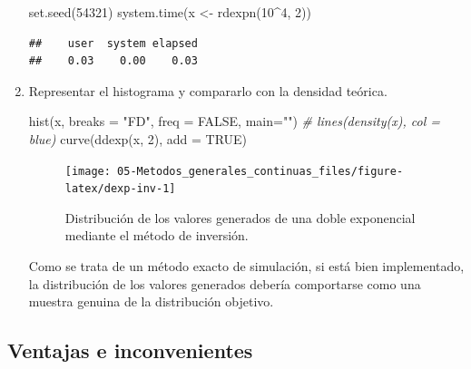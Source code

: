 \documentclass[
]{book}
\newenvironment{Shaded}{\begin{snugshade}}{\end{snugshade}}
\newcommand{\AttributeTok}[1]{\textcolor[rgb]{0.77,0.63,0.00}{#1}}
\newcommand{\CommentTok}[1]{\textcolor[rgb]{0.56,0.35,0.01}{\textit{#1}}}
\newcommand{\ConstantTok}[1]{\textcolor[rgb]{0.00,0.00,0.00}{#1}}
\newcommand{\DecValTok}[1]{\textcolor[rgb]{0.00,0.00,0.81}{#1}}
\newcommand{\FunctionTok}[1]{\textcolor[rgb]{0.00,0.00,0.00}{#1}}
\newcommand{\NormalTok}[1]{#1}
\newcommand{\OtherTok}[1]{\textcolor[rgb]{0.56,0.35,0.01}{#1}}
\newcommand{\SpecialCharTok}[1]{\textcolor[rgb]{0.00,0.00,0.00}{#1}}
\newcommand{\StringTok}[1]{\textcolor[rgb]{0.31,0.60,0.02}{#1}}
\theoremstyle{break}
\theoremstyle{definition}
\theoremstyle{definition}
\theoremstyle{definition}
\theoremstyle{definition}
\theoremstyle{remark}
\begin{document}
\begin{enumerate}
\begin{Shaded}
\begin{Highlighting}[]
\FunctionTok{set.seed}\NormalTok{(}\DecValTok{54321}\NormalTok{)}
\FunctionTok{system.time}\NormalTok{(x }\OtherTok{\textless{}{-}} \FunctionTok{rdexpn}\NormalTok{(}\DecValTok{10}\SpecialCharTok{\^{}}\DecValTok{4}\NormalTok{, }\DecValTok{2}\NormalTok{))}
\end{Highlighting}
\end{Shaded}

\begin{verbatim}
##    user  system elapsed 
##    0.03    0.00    0.03
\end{verbatim}
\item
  Representar el histograma y compararlo con la densidad teórica.

\begin{Shaded}
\begin{Highlighting}[]
\FunctionTok{hist}\NormalTok{(x, }\AttributeTok{breaks =} \StringTok{"FD"}\NormalTok{, }\AttributeTok{freq =} \ConstantTok{FALSE}\NormalTok{, }\AttributeTok{main=}\StringTok{""}\NormalTok{)}
\CommentTok{\# lines(density(x), col = \textquotesingle{}blue\textquotesingle{})}
\FunctionTok{curve}\NormalTok{(}\FunctionTok{ddexp}\NormalTok{(x, }\DecValTok{2}\NormalTok{), }\AttributeTok{add =} \ConstantTok{TRUE}\NormalTok{)}
\end{Highlighting}
\end{Shaded}

  \begin{figure}[!htb]

  {\centering \texttt{[image: 05-Metodos\_generales\_continuas\_files/figure-latex/dexp-inv-1]} 

  }

  \caption{Distribución de los valores generados de una doble exponencial mediante el método de inversión.}\label{fig:dexp-inv}
  \end{figure}

  Como se trata de un método exacto de simulación, si está bien implementado, la distribución de los valores generados debería comportarse como una muestra genuina de la distribución objetivo.
\end{enumerate}

\hypertarget{ventajas-e-inconvenientes}{%
\subsection{Ventajas e inconvenientes}\label{ventajas-e-inconvenientes}}
\end{document}
